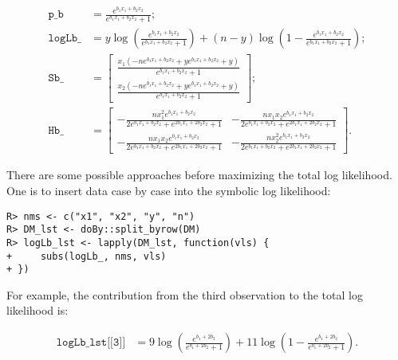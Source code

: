 \begin{align}
\texttt{p\_b}   &= \frac{e^{b_{1} x_{1} + b_{2} x_{2}}}{e^{b_{1} x_{1} + b_{2} x_{2}} + 1}; \\
\texttt{logLb}\_ &= y \log{\left(\frac{e^{b_{1} x_{1} + b_{2} x_{2}}}{e^{b_{1} x_{1} + b_{2} x_{2}} + 1} \right)} + \left(n - y\right) \log{\left(1 - \frac{e^{b_{1} x_{1} + b_{2} x_{2}}}{e^{b_{1} x_{1} + b_{2} x_{2}} + 1} \right)}; \\
\texttt{Sb}\_    &= \left[\begin{matrix}\frac{x_{1} \left(- n e^{b_{1} x_{1} + b_{2} x_{2}} + y e^{b_{1} x_{1} + b_{2} x_{2}} + y\right)}{e^{b_{1} x_{1} + b_{2} x_{2}} + 1}\\\frac{x_{2} \left(- n e^{b_{1} x_{1} + b_{2} x_{2}} + y e^{b_{1} x_{1} + b_{2} x_{2}} + y\right)}{e^{b_{1} x_{1} + b_{2} x_{2}} + 1}\end{matrix}\right]; \\
\texttt{Hb}\_    &= \left[\begin{matrix}- \frac{n x_{1}^{2} e^{b_{1} x_{1} + b_{2} x_{2}}}{2 e^{b_{1} x_{1} + b_{2} x_{2}} + e^{2 b_{1} x_{1} + 2 b_{2} x_{2}} + 1} & - \frac{n x_{1} x_{2} e^{b_{1} x_{1} + b_{2} x_{2}}}{2 e^{b_{1} x_{1} + b_{2} x_{2}} + e^{2 b_{1} x_{1} + 2 b_{2} x_{2}} + 1}\\- \frac{n x_{1} x_{2} e^{b_{1} x_{1} + b_{2} x_{2}}}{2 e^{b_{1} x_{1} + b_{2} x_{2}} + e^{2 b_{1} x_{1} + 2 b_{2} x_{2}} + 1} & - \frac{n x_{2}^{2} e^{b_{1} x_{1} + b_{2} x_{2}}}{2 e^{b_{1} x_{1} + b_{2} x_{2}} + e^{2 b_{1} x_{1} + 2 b_{2} x_{2}} + 1}\end{matrix}\right] . 
\end{align}

There are some possible approaches before
maximizing the total log likelihood. One is to insert data case by
case into the symbolic log likelihood:

\begin{verbatim}
R> nms <- c("x1", "x2", "y", "n")
R> DM_lst <- doBy::split_byrow(DM)
R> logLb_lst <- lapply(DM_lst, function(vls) {
+     subs(logLb_, nms, vls)
+ })
\end{verbatim}

For example, the contribution from the third observation to the total log likelihood is:

\begin{align}
\texttt{logLb\_lst[[3]]}  &= 9 \log{\left(\frac{e^{b_{1} + 2 b_{2}}}{e^{b_{1} + 2 b_{2}} + 1} \right)} + 11 \log{\left(1 - \frac{e^{b_{1} + 2 b_{2}}}{e^{b_{1} + 2 b_{2}} + 1} \right)}.
\end{align}

